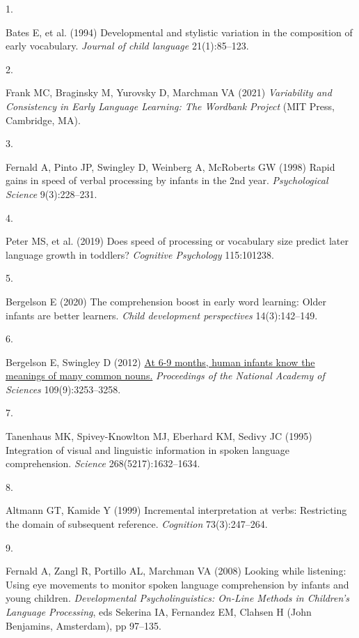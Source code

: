 \documentclass[9pt,twocolumn,twoside,]{pnas-new}
\newlength{\cslhangindent}
\newlength{\csllabelwidth}
\newenvironment{CSLReferences}[2] %
 {\begin{list}{}{%
  \setlength{\itemindent}{0pt}
  \setlength{\leftmargin}{0pt}
  \setlength{\parsep}{0pt}
  \ifodd #1
   \setlength{\leftmargin}{\cslhangindent}
   \setlength{\itemindent}{-1\cslhangindent}
  \fi
  \setlength{\itemsep}{#2\baselineskip}}}
 {\end{list}}
\newcommand{\CSLLeftMargin}[1]{\parbox[t]{\csllabelwidth}{#1}}
\newcommand{\CSLRightInline}[1]{\parbox[t]{\linewidth - \csllabelwidth}{#1}\break}
\begin{document}
\label{refs}
\begin{CSLReferences}{0}{1}
\CSLLeftMargin{1. }%
\CSLRightInline{Bates E, et al. (1994) Developmental and stylistic
variation in the composition of early vocabulary. \emph{Journal of child
language} 21(1):85--123.}

\CSLLeftMargin{2. }%
\CSLRightInline{Frank MC, Braginsky M, Yurovsky D, Marchman VA (2021)
\emph{{Variability and Consistency in Early Language Learning: The
Wordbank Project}} (MIT Press, Cambridge, MA).}

\CSLLeftMargin{3. }%
\CSLRightInline{Fernald A, Pinto JP, Swingley D, Weinberg A, McRoberts
GW (1998) Rapid gains in speed of verbal processing by infants in the
2nd year. \emph{Psychological Science} 9(3):228--231.}

\CSLLeftMargin{4. }%
\CSLRightInline{Peter MS, et al. (2019) Does speed of processing or
vocabulary size predict later language growth in toddlers?
\emph{Cognitive Psychology} 115:101238.}

\CSLLeftMargin{5. }%
\CSLRightInline{Bergelson E (2020) The comprehension boost in early word
learning: Older infants are better learners. \emph{Child development
perspectives} 14(3):142--149.}

\CSLLeftMargin{6. }%
\CSLRightInline{Bergelson E, Swingley D (2012)
\href{https://www.ncbi.nlm.nih.gov/pubmed/22331874}{{At 6-9 months,
human infants know the meanings of many common nouns.}}
\emph{Proceedings of the National Academy of Sciences}
109(9):3253--3258.}

\CSLLeftMargin{7. }%
\CSLRightInline{Tanenhaus MK, Spivey-Knowlton MJ, Eberhard KM, Sedivy JC
(1995) Integration of visual and linguistic information in spoken
language comprehension. \emph{Science} 268(5217):1632--1634.}

\CSLLeftMargin{8. }%
\CSLRightInline{Altmann GT, Kamide Y (1999) Incremental interpretation
at verbs: Restricting the domain of subsequent reference.
\emph{Cognition} 73(3):247--264.}

\CSLLeftMargin{9. }%
\CSLRightInline{Fernald A, Zangl R, Portillo AL, Marchman VA (2008)
{Looking while listening: Using eye movements to monitor spoken language
comprehension by infants and young children}. \emph{Developmental
Psycholinguistics: On-Line Methods in Children's Language Processing},
eds Sekerina IA, Fernandez EM, Clahsen H (John Benjamins, Amsterdam), pp
97--135.}


\end{CSLReferences}
\end{document}
